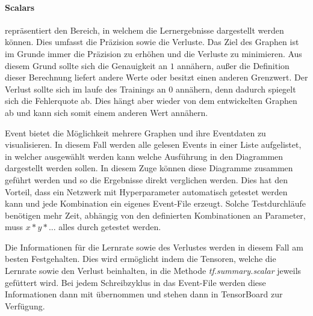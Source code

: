 \paragraph{Scalars} repräsentiert den Bereich, in welchem die Lernergebnisse dargestellt werden können. 
Dies umfasst die Präzision sowie die Verluste. 
Das Ziel des Graphen ist im Grunde immer die Präzision zu erhöhen und die Verluste zu minimieren. 
Aus diesem Grund sollte sich die Genauigkeit an $1$ annähern, außer die Definition dieser Berechnung liefert andere Werte oder besitzt einen anderen Grenzwert. 
Der Verlust sollte sich im laufe des Trainings an $0$ annähern, denn dadurch spiegelt sich die Fehlerquote ab. 
Dies hängt aber wieder von dem entwickelten Graphen ab und kann sich somit einem anderen Wert annähern.
\phantom \newline 

\noindent
Event bietet die Möglichkeit mehrere Graphen und ihre Eventdaten zu visualisieren. 
In diesem Fall werden alle gelesen Events in einer Liste aufgelistet, in welcher ausgewählt werden kann welche Ausführung in den Diagrammen dargestellt werden sollen. 
In diesem Zuge können diese Diagramme zusammen geführt werden und so die Ergebnisse direkt verglichen werden. 
Dies hat den Vorteil, dass ein Netzwerk mit Hyperparameter automatisch getestet werden kann und jede Kombination ein eigenes Event-File erzeugt. 
Solche Testdurchläufe benötigen mehr Zeit, abhängig von den definierten Kombinationen an Parameter, muss $x * y * ...$ alles durch getestet werden.
\phantom \newline

\noindent
Die Informationen für die Lernrate sowie des Verlustes werden in diesem Fall am besten Festgehalten. 
Dies wird ermöglicht indem die Tensoren, welche die Lernrate sowie den Verlust beinhalten, in die Methode \textit{tf.summary.scalar} jeweils gefüttert wird. 
Bei jedem Schreibzyklus in das Event-File werden diese Informationen dann mit übernommen und stehen dann in TensorBoard zur Verfügung.

